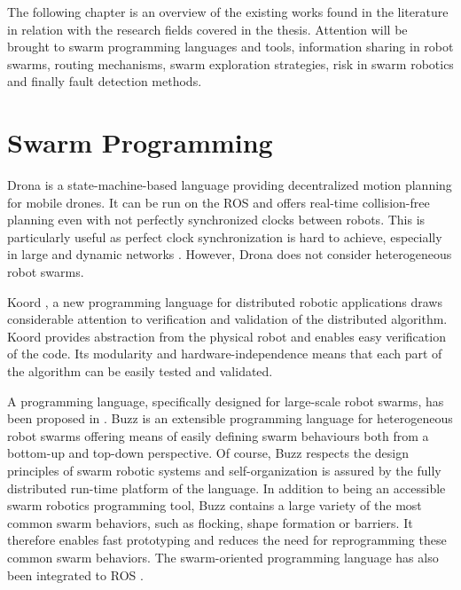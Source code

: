 \label{sec:RevLitt}
The following chapter is an overview of the existing works found in the literature in relation with the research fields covered in the thesis. Attention will be brought to swarm programming languages and tools, information sharing in robot swarms, routing mechanisms, swarm exploration strategies, risk in swarm robotics and finally fault detection methods. 

\section{Swarm Programming}
Drona \cite{desai2017drona} is a state-machine-based language providing decentralized motion planning for mobile drones. It can be run on the \ac{ROS} \cite{quigley2009ros} and offers real-time collision-free planning even with not perfectly synchronized clocks between robots. This is particularly useful as perfect clock synchronization is hard to achieve, especially in large and dynamic networks \cite{cao2021distributed}. However, Drona does not consider heterogeneous robot swarms.

Koord \cite{ghosh2020koord}, a new programming language for distributed robotic applications draws considerable attention to verification and validation of the distributed algorithm. Koord provides abstraction from the physical robot and enables easy verification of the code. Its modularity and hardware-independence means that each part of the algorithm can be easily tested and validated.

A programming language, specifically designed for large-scale robot swarms, has been proposed in \cite{pinciroliBuzz2016}. Buzz is an extensible programming language for heterogeneous robot swarms offering means of easily defining swarm behaviours both from a bottom-up and top-down perspective. Of course, Buzz respects the design principles of swarm robotic systems and self-organization is assured by the fully distributed run-time platform of the language. In addition to being an accessible swarm robotics programming tool, Buzz contains a large variety of the most common swarm behaviors, such as flocking, shape formation or barriers. It therefore enables fast prototyping and reduces the need for reprogramming these common swarm behaviors. The swarm-oriented programming language has also been integrated to \ac{ROS} \cite{st2017ros}.

